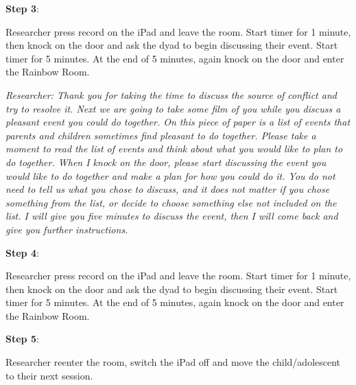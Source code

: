 \documentclass[]{book}
\begin{document}
\textbf{Step 3}:

Researcher press record on the iPad and leave the room. Start timer for 1 minute, then knock on the door and ask the dyad to begin discussing their event. Start timer for 5 minutes. At the end of 5 minutes, again knock on the door and enter the Rainbow Room.

\emph{Researcher: Thank you for taking the time to discuss the source of conflict and try to resolve it. Next we are going to take some film of you while you discuss a pleasant event you could do together. On this piece of paper is a list of events that parents and children sometimes find pleasant to do together. Please take a moment to read the list of events and think about what you would like to plan to do together. When I knock on the door, please start discussing the event you would like to do together and make a plan for how you could do it. You do not need to tell us what you chose to discuss, and it does not matter if you chose something from the list, or decide to choose something else not included on the list. I will give you five minutes to discuss the event, then I will come back and give you further instructions.}

\textbf{Step 4}:

Researcher press record on the iPad and leave the room. Start timer for 1 minute, then knock on the door and ask the dyad to begin discussing their event. Start timer for 5 minutes. At the end of 5 minutes, again knock on the door and enter the Rainbow Room.

\textbf{Step 5}:

Researcher reenter the room, switch the iPad off and move the child/adolescent to their next session.
\end{document}

